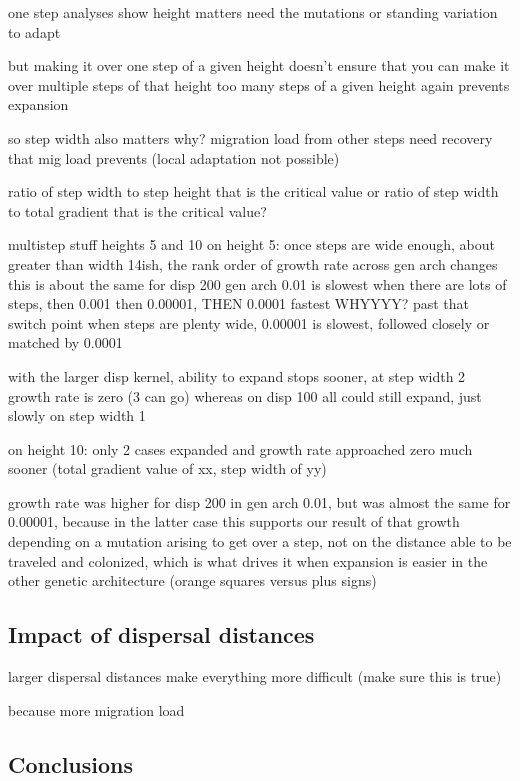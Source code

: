 one step analyses show height matters
need the mutations or standing variation to adapt

but making it over one step of a given height doesn't ensure that you can make it over multiple steps of that height
too many steps of a given height again prevents expansion
	
so step width also matters
	why?
	migration load from other steps
	need recovery that mig load prevents (local adaptation not possible)
		
	ratio of step width to step height that is the critical value
	or ratio of step width to total gradient that is the critical value?





multistep stuff heights 5 and 10
on height 5:
once steps are wide enough, about greater than width 14ish, the rank order of growth rate across gen arch changes
this is about the same for disp 200
gen arch 0.01 is slowest when there are lots of steps, then 0.001 then 0.00001, THEN 0.0001 fastest WHYYYY?
past that switch point when steps are plenty wide, 0.00001 is slowest, followed closely or matched by 0.0001

with the larger disp kernel, ability to expand stops sooner, at step width 2 growth rate is zero (3 can go) whereas on disp 100 all could still expand, just slowly on step width 1


on height 10:
only 2 cases expanded and growth rate approached zero much sooner (total gradient value of xx, step width of yy)

growth rate was higher for disp 200 in gen arch 0.01, but was almost the same for 0.00001, because in the latter case this supports our result of that growth depending on a mutation arising to get over a step, not on the distance able to be traveled and colonized, which is what drives it when expansion is easier in the other genetic architecture (orange squares versus plus signs)



\subsection{Impact of dispersal distances}

larger dispersal distances make everything more difficult (make sure this is true)

because more migration load


\subsection{Conclusions}





